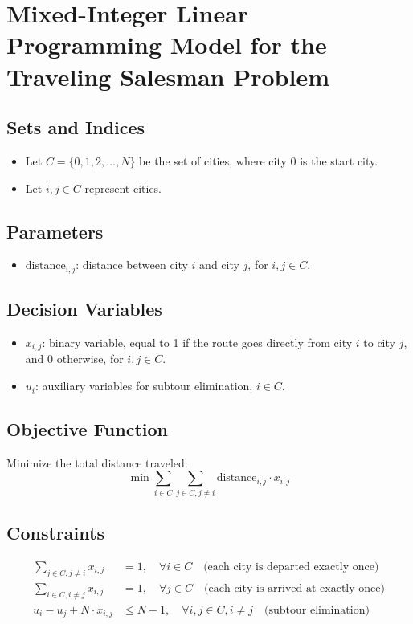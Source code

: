 \documentclass{article}
\begin{document}
\section*{Mixed-Integer Linear Programming Model for the Traveling Salesman Problem}

\subsection*{Sets and Indices}
\begin{itemize}
    \item Let \( C = \{0, 1, 2, \ldots, N\} \) be the set of cities, where city \( 0 \) is the start city.
    \item Let \( i, j \in C \) represent cities.
\end{itemize}

\subsection*{Parameters}
\begin{itemize}
    \item \( \text{distance}_{i,j} \): distance between city \( i \) and city \( j \), for \( i, j \in C \).
\end{itemize}

\subsection*{Decision Variables}
\begin{itemize}
    \item \( x_{i,j} \): binary variable, equal to 1 if the route goes directly from city \( i \) to city \( j \), and 0 otherwise, for \( i, j \in C \).
    \item \( u_i \): auxiliary variables for subtour elimination, \( i \in C \).
\end{itemize}

\subsection*{Objective Function}
Minimize the total distance traveled:
\[
\min \sum_{i \in C} \sum_{j \in C, j \neq i} \text{distance}_{i,j} \cdot x_{i,j}
\]

\subsection*{Constraints}
\begin{align}
\sum_{j \in C, j \neq i} x_{i,j} &= 1, \quad \forall i \in C \quad \text{(each city is departed exactly once)} \\
\sum_{i \in C, i \neq j} x_{i,j} &= 1, \quad \forall j \in C \quad \text{(each city is arrived at exactly once)} \\
u_i - u_j + N \cdot x_{i,j} &\leq N-1, \quad \forall i, j \in C, i \neq j \quad \text{(subtour elimination)}
\end{align}
\end{document}
